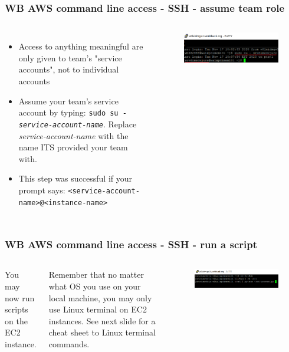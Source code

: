 \documentclass[aspectratio=169]{beamer} %
\begin{document}
\begin{frame}
	\frametitle{WB AWS command line access - SSH - assume team role}
	\begin{columns}[c]
		\begin{itemize}
			\item Access to anything meaningful are only given to  team's "service accounts", not to individual accounts
			\item Assume your team's service account by typing: \newline
			\texttt{sudo su - \textit{service-account-name}}. Replace \textit{service-account-name} with the name 
			ITS provided your team with.
			\item This step was successful if 
			your prompt says:
			\newline\texttt{<service-account-name>@<instance-name>}
		\end{itemize}

		\begin{figure}
			\centering
			\includegraphics[width=\textwidth]{./img/access-4.png}
		\end{figure}

	\end{columns}
\end{frame}

\begin{frame}
	\frametitle{WB AWS command line access - SSH - run a script}
	\vspace{1cm}
	\begin{columns}[c]
		You may now run scripts on the EC2 instance. 
		
		\vspace{.5cm}
		
		Remember that no matter what OS you use
		on your local machine, 
		you may only use Linux terminal on EC2 instances.
		See next slide for a cheat sheet to Linux terminal commands.
		
		\begin{figure}
			\centering
			\includegraphics[width=\textwidth]{./img/access-5.png}
		\end{figure}
	\end{columns}
\end{frame}
\end{document}
